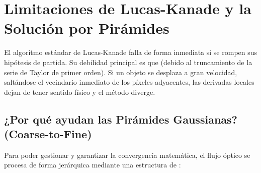 \section{Limitaciones de Lucas-Kanade y la Solución por Pirámides}


\noindent
El algoritmo estándar de Lucas-Kanade falla de forma inmediata si se rompen sus hipótesis de partida. Su debilidad principal es que  (debido al truncamiento de la serie de Taylor de primer orden). Si un objeto se desplaza a gran velocidad, saltándose el vecindario inmediato de los píxeles adyacentes, las derivadas locales dejan de tener sentido físico y el método diverge.

\subsection{¿Por qué ayudan las Pirámides Gaussianas? (Coarse-to-Fine)}
\noindent
Para poder gestionar  y garantizar la convergencia matemática, el flujo óptico se procesa de forma jerárquica mediante una estructura de :

